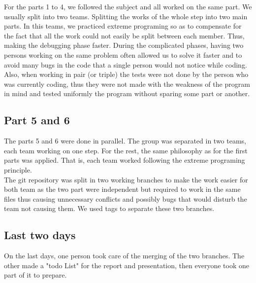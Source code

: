 For the parts 1 to 4, we followed the subject and all worked on the same part.
We usually split into two teams. Splitting the works of the whole step into
two main parts. In this teams, we practiced extreme programing so as to
compensate for the fact that all the work could not easily be split between
each member. Thus, making the debugging phase faster. During the complicated
phases, having two persons working on the same problem often allowed us to
solve it faster and to avoid many bugs in the code that a single person would
not notice while coding.\\
Also, when working in pair (or triple) the tests were not done by the person
who was currently coding, thus they were not made with the weakness of the
program in mind and tested uniformly the program without sparing some part or
another.

\subsection{Part 5 and 6}

The parts 5 and 6 were done in parallel. The group was separated in two teams,
each team working on one step.  For the rest, the same philosophy as for the
first parts was applied. That is, each team worked following the extreme
programing principle.\\
The git repository was split in two working branches to make the work easier
for both team as the two part were independent but required to work in the same
files thus causing unnecessary conflicts and possibly bugs that would disturb
the team not causing them. We used tags to separate these two branches.

\subsection{Last two days}

On the last days, one person took care of the merging of the two branches. The
other made a "todo List" for the report and presentation, then everyone took
one part of it to prepare. 
